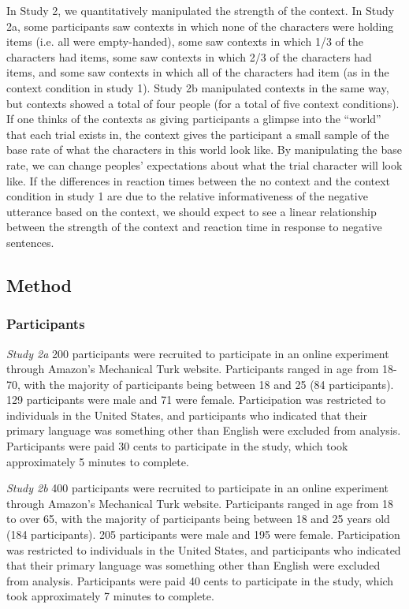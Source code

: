 \documentclass[10pt,letterpaper]{article}
\begin{document}
In Study 2, we quantitatively manipulated the strength of the context.  In Study 2a, some participants saw contexts in which none of the characters were holding items (i.e. all were empty-handed), some saw contexts in which 1/3  of the characters had items, some saw contexts in which 2/3 of the characters had items, and some saw contexts in which all of the characters had item (as in the context condition in study 1).  Study 2b manipulated contexts in the same way, but contexts showed a total of four people (for a total of five context conditions).  If one thinks of the contexts as giving participants a glimpse into the ``world'' that each trial exists in, the context gives the participant a small sample of the base rate of what the characters in this world look like.  By manipulating the base rate, we can change peoples' expectations about what the trial character will look like.  If the differences in reaction times between the no context and the context condition in study 1 are due to the relative informativeness of the negative utterance based on the context, we should expect to see a linear relationship between the strength of the context and reaction time in response to negative sentences. 

\subsection{Method}

\subsubsection{Participants}
\emph{Study 2a}
200 participants were recruited to participate in an online experiment through Amazon's Mechanical Turk website.  Participants ranged in age from 18-70, with the majority of participants being between 18 and 25 (84 participants).  129 participants were male and 71 were female.  Participation was restricted to individuals in the United States, and participants who indicated that their primary language was something other than English were excluded from analysis.  Participants were paid 30 cents to participate in the study, which took approximately 5 minutes to complete.  

\emph{Study 2b}
400 participants were recruited to participate in an online experiment through Amazon's Mechanical Turk website.  Participants ranged in age from 18 to over 65, with the majority of participants being between 18 and 25 years old (184 participants).  205 participants were male and 195 were female.  Participation was restricted to individuals in the United States, and participants who indicated that their primary language was something other than English were excluded from analysis.  Participants were paid 40 cents to participate in the study, which took approximately 7 minutes to complete.
\end{document}
